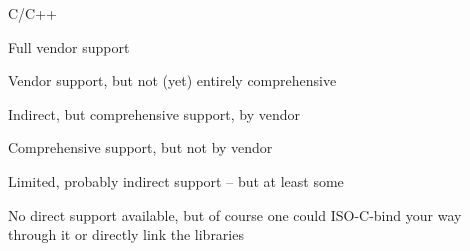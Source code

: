 \begin{multicols}{2}
    \begin{description}
      \item[\C] C/C++
      \item[\fullok] Full vendor support
      \item[\prettyok] Vendor support, but not (yet) entirely comprehensive
      \item[\indirectok] Indirect, but comprehensive support, by vendor
      \item[\nonvendorok] Comprehensive support, but not by vendor
      \item[\somesupport] Limited, probably indirect support -- but at least some
      \item[\nope] No direct support available, but of course one could ISO-C-bind your way through it or directly link the libraries
    \end{description}
\end{multicols}

